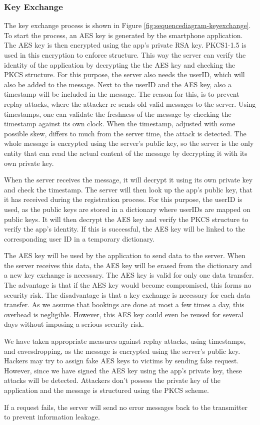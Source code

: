 \documentclass[12pt,a4paper, oneside]{article}
\newlength{\drop}
\begin{document}
\subsubsection{Key Exchange}
\label{sec:keyexchange}
The key exchange process is shown in Figure \ref{fig:sequencediagram-keyexchange}. To start the process, an AES key is generated by the smartphone application. The AES key is then encrypted using the app's private RSA key. PKCS1-1.5 is used in this encryption to enforce structure. This way the server can verify the identity of the application by decrypting the the AES key and checking the PKCS structure. For this purpose, the server also needs the userID, which will also be added to the message. Next to the userID and the AES key, also a timestamp will be included in the message. The reason for this, is to prevent replay attacks, where the attacker re-sends old valid messages to the server. Using timestamps, one can validate the freshness of the message by checking the timestamp against its own clock. When the timestamp, adjusted with some possible skew, differs to much from the server time, the attack is detected.
The whole message is encrypted using the server's public key, so the server is the only entity that can read the actual content of the message by decrypting it with its own private key. 
\par
When the server receives the message, it will decrypt it using its own private key and check the timestamp. The server will then look up the app's public key, that it has received during the registration process. For this purpose, the userID is used, as the public keys are stored in a dictionary where userIDs are mapped on public keys. It will then decrypt the AES key and verify the PKCS structure to verify the app's identity. If this is successful, the AES key will be linked to the corresponding user ID in a temporary dictionary.
\par
The AES key will be used by the application to send data to the server. When the server receives this data, the AES key will be erased from the dictionary and a new key exchange is necessary. The AES key is valid for only one data transfer. The advantage is that if the AES key would become compromised, this forms no security risk. The disadvantage is that a key exchange is necessary for each data transfer. As we assume that bookings are done at most  a few times a day, this overhead is negligible. However,  this AES key could even be reused for several days without imposing a serious security risk. 
\par
We have taken appropriate measures against replay attacks, using timestamps, and eavesdropping, as the message is encrypted using the server's public key. Hackers may try to assign fake AES keys to victims by sending fake request. However, since we have signed the AES key using the app's private key, these attacks will be detected. Attackers don't possess  the private key of the application and the message is structured using the PKCS scheme. 
\par
If a request fails, the server will send no error messages back to the transmitter to prevent information leakage.
\end{document}
